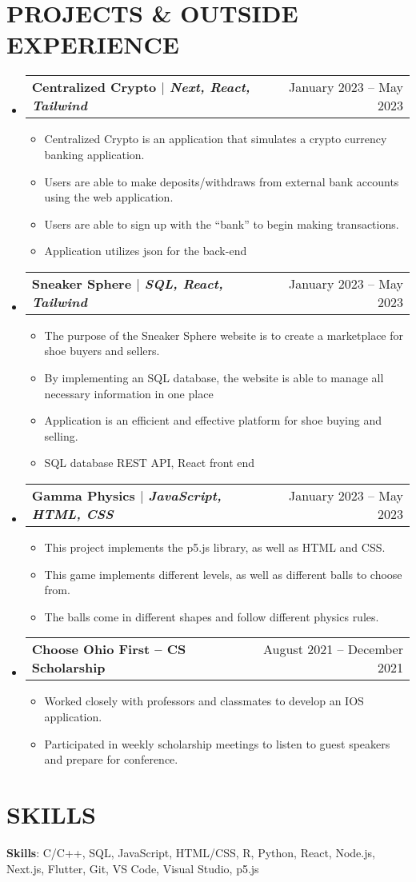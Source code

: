 \documentclass[letterpaper,11pt]{article}
\makeatletter
\newcommand{\projectItem}[1]{
  \item\small{#1}
}
\newcommand{\projectSubHeading}[2]{
  \vspace{-1pt}\item
    \begin{tabular*}{0.97\textwidth}[t]{l@{\extracolsep{\fill}}r}
      \textbf{#1} & #2 \\
    \end{tabular*}\vspace{-5pt}
}
\newcommand{\resumeItemListStart}{\begin{itemize}[leftmargin=*,label=\textbullet]}
\newcommand{\resumeItemListEnd}{\end{itemize}}
\makeatother
\begin{document}
\section{PROJECTS \& OUTSIDE EXPERIENCE}
  \begin{itemize}[leftmargin=0pt,label={}]
    \projectSubHeading
      {\textbf{Centralized Crypto} $|$ \emph{Next, React, Tailwind}}{January 2023 -- May 2023}
      \resumeItemListStart
        \projectItem
          {Centralized Crypto is an application that simulates a crypto currency banking application.}
        \projectItem
          {Users are able to make deposits/withdraws from external bank accounts using the web application.}
        \projectItem
          {Users are able to sign up with the “bank” to begin making transactions.}
        \projectItem
          {Application utilizes json for the back-end}
      \resumeItemListEnd
    \projectSubHeading
      {\textbf{Sneaker Sphere} $|$ \emph{SQL, React, Tailwind}}{January 2023 -- May 2023}
      \resumeItemListStart
        \projectItem
          {The purpose of the Sneaker Sphere website is to create a marketplace for shoe buyers and sellers.}
        \projectItem
          {By implementing an SQL database, the website is able to manage all necessary information in one place}
        \projectItem
          {Application is an efficient and effective platform for shoe buying and selling.}
        \projectItem
          {SQL database REST API, React front end}
      \resumeItemListEnd
    \projectSubHeading
      {\textbf{Gamma Physics} $|$ \emph{JavaScript, HTML, CSS}}{January 2023 -- May 2023}
      \resumeItemListStart
        \projectItem
          {This project implements the p5.js library, as well as HTML and CSS.}
        \projectItem
          {This game implements different levels, as well as different balls to choose from.}
        \projectItem
          {The balls come in different shapes and follow different physics rules.}
      \resumeItemListEnd
    \projectSubHeading
      {\textbf{Choose Ohio First -- CS Scholarship}}{August 2021 -- December 2021}
      \resumeItemListStart
        \projectItem
          {Worked closely with professors and classmates to develop an IOS application.}
        \projectItem
          {Participated in weekly scholarship meetings to listen to guest speakers and prepare for conference.}
      \resumeItemListEnd
  \end{itemize}

\section{SKILLS}
    \small{\textbf{Skills}{: C/C++, SQL, JavaScript, HTML/CSS, R, Python, React, Node.js, Next.js, Flutter, Git, VS Code, Visual Studio, p5.js}}

\end{document}
